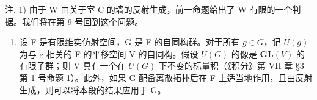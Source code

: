 注. 1) 由于 W 由关于室 C 的墙的反射生成，前一命题给出了 W 有限的一个判据。我们将在第 9 号回到这个问题。

\begin{enumerate}
\def\labelenumi{\arabic{enumi})}
\setcounter{enumi}{1}
\tightlist
\item
设 F 是有限维实仿射空间，G 是 F 的自同构群。对于所有 \(g \in G\)，记 \(U(g)\) 为与 g 相关的 F 的平移空间 V 的自同构。假设 \(U(G)\) 的像是 \(\mathbf{GL}(V)\) 的有限子群；则 V 具有一个在 \(U(G)\) 下不变的标量积（《积分》第 VII 章 §3 第 1 号命题 1）。此外，如果 G 配备离散拓扑后在 F 上适当地作用，且由反射生成，则可以将本段的结果应用于 G。
\end{enumerate}


